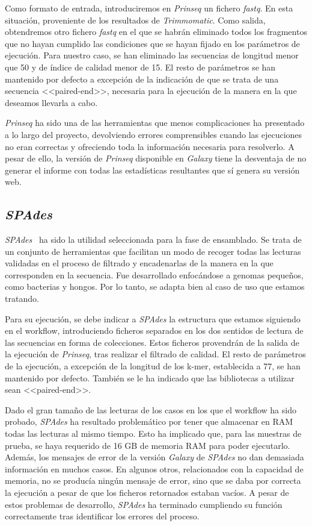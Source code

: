 Como formato de entrada, introduciremos en \textit{Prinseq} un fichero \textit{fastq}. En esta situación, proveniente de los resultados de \textit{Trimmomatic}. Como salida, obtendremos otro fichero \textit{fastq} en el que se habrán eliminado todos los fragmentos que no hayan cumplido las condiciones que se hayan fijado en los parámetros de ejecución. Para nuestro caso, se han eliminado las secuencias de longitud menor que 50 y de índice de calidad menor de 15. El resto de parámetros se han mantenido por defecto a excepción de la indicación de que se trata de una secuencia <<paired-end>>, necesaria para la ejecución de la manera en la que deseamos llevarla a cabo.

\textit{Prinseq} ha sido una de las herramientas que menos complicaciones ha presentado a lo largo del proyecto, devolviendo errores comprensibles cuando las ejecuciones no eran correctas y ofreciendo toda la información necesaria para resolverlo. A pesar de ello, la versión de \textit{Prinseq} disponible en \textit{Galaxy} tiene la desventaja de no generar el informe con todas las estadísticas resultantes que sí genera su versión web.

\subsection{\itshape{SPAdes}}
\textit{SPAdes}~\cite{Nurk2013} ha sido la utilidad seleccionada para la fase de ensamblado. Se trata de un conjunto de herramientas que facilitan un modo de recoger todas las lecturas validadas en el proceso de filtrado y encadenarlas de la manera en la que corresponden en la secuencia. Fue desarrollado enfocándose a genomas pequeños, como bacterias y hongos. Por lo tanto, se adapta bien al caso de uso que estamos tratando.

Para su ejecución, se debe indicar a \textit{SPAdes} la estructura que estamos siguiendo en el workflow, introduciendo ficheros separados en los dos sentidos de lectura de las secuencias en forma de colecciones. Estos ficheros provendrán de la salida de la ejecución de \textit{Prinseq}, tras realizar el filtrado de calidad. El resto de parámetros de la ejecución, a excepción de la longitud de los k-mer, establecida a 77, se han mantenido por defecto. También se le ha indicado que las bibliotecas a utilizar sean <<paired-end>>.

Dado el gran tamaño de las lecturas de los casos en los que el workflow ha sido probado, \textit{SPAdes} ha resultado problemático por tener que almacenar en RAM todas las lecturas al mismo tiempo. Esto ha implicado que, para las muestras de prueba, se haya requerido de 16 GB de memoria RAM para poder ejecutarlo. Además, los mensajes de error de la versión \textit{Galaxy} de \textit{SPAdes} no dan demasiada información en muchos casos. En algunos otros, relacionados con la capacidad de memoria, no se producía ningún mensaje de error, sino que se daba por correcta la ejecución a pesar de que los ficheros retornados estaban vacíos. A pesar de estos problemas de desarrollo, \textit{SPAdes} ha terminado cumpliendo su función correctamente tras identificar los errores del proceso. 

